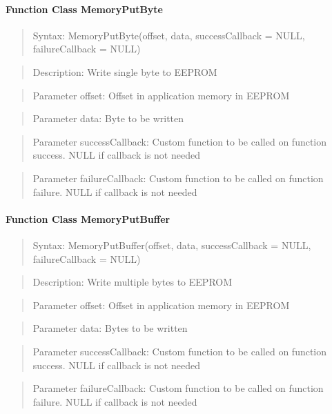 \paragraph{Function Class MemoryPutByte}
\begin{quote}Syntax: MemoryPutByte(offset, data, successCallback = NULL, failureCallback = NULL)\end{quote}
\begin{quote}Description: Write single byte to EEPROM\end{quote}
\begin{quote}Parameter offset: Offset in application memory in EEPROM\end{quote}
\begin{quote}Parameter data: Byte to be written\end{quote}
\begin{quote}Parameter successCallback: Custom function to be called on function success. NULL if callback is not needed\end{quote}
\begin{quote}Parameter failureCallback: Custom function to be called on function failure. NULL if callback is not needed\end{quote}


\paragraph{Function Class MemoryPutBuffer}
\begin{quote}Syntax: MemoryPutBuffer(offset, data, successCallback = NULL, failureCallback = NULL)\end{quote}
\begin{quote}Description: Write multiple bytes to EEPROM\end{quote}
\begin{quote}Parameter offset: Offset in application memory in EEPROM\end{quote}
\begin{quote}Parameter data: Bytes to be written\end{quote}
\begin{quote}Parameter successCallback: Custom function to be called on function success. NULL if callback is not needed\end{quote}
\begin{quote}Parameter failureCallback: Custom function to be called on function failure. NULL if callback is not needed\end{quote}


